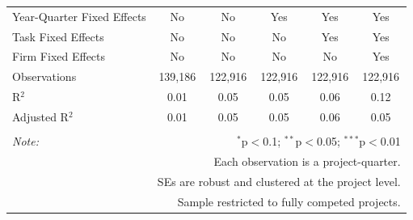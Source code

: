 \documentclass[
]{article}
\begin{document}
\begin{table}[H]
\begin{tabular}{@{\extracolsep{-2pt}}lccccc}
Year-Quarter Fixed Effects & No & No & Yes & Yes & Yes \\ 
Task Fixed Effects & No & No & No & Yes & Yes \\ 
Firm Fixed Effects & No & No & No & No & Yes \\ 
Observations & 139,186 & 122,916 & 122,916 & 122,916 & 122,916 \\ 
R$^{2}$ & 0.01 & 0.05 & 0.05 & 0.06 & 0.12 \\ 
Adjusted R$^{2}$ & 0.01 & 0.05 & 0.05 & 0.06 & 0.05 \\ 
\hline 
\hline \\[-1.8ex] 
\textit{Note:}  & \multicolumn{5}{r}{$^{*}$p$<$0.1; $^{**}$p$<$0.05; $^{***}$p$<$0.01} \\ 
 & \multicolumn{5}{r}{Each observation is a project-quarter.} \\ 
 & \multicolumn{5}{r}{SEs are robust and clustered at the project level.} \\ 
 & \multicolumn{5}{r}{Sample restricted to fully competed projects.} \\ 
\end{tabular} 
\end{table}
\end{document}
